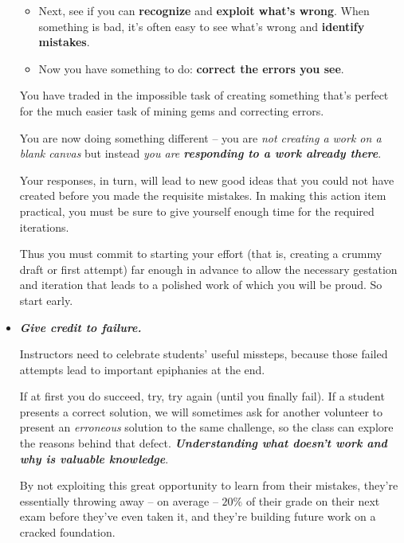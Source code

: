 \documentclass[11pt]{article}
\begin{document}
\begin{itemize}
\begin{exercise}
\begin{itemize}
\item Next, see if you can \textbf{recognize} and \textbf{exploit what’s wrong}. When something is bad, it’s often easy to see what’s wrong and \textbf{identify mistakes}. 

\item Now you have something to do: \textbf{correct the errors you see}. 
\end{itemize}
\end{exercise}
You have traded in the impossible task of creating something that’s perfect for the much easier task of mining gems and correcting errors. 

You are now doing something different -- you are \emph{not creating a work on a blank canvas} but instead \emph{you are \textbf{responding to a work already there}}. 

Your responses, in turn, will lead to new good ideas that you could not have created before you made the requisite mistakes. In making this action item practical, you must be sure to give yourself enough time for the required iterations. 

Thus you must commit to starting your effort (that is, creating a crummy draft or first attempt) far enough in advance to allow the necessary gestation and iteration that leads to a polished work of which you will be proud. So start early.


\item \emph{\textbf{Give credit to failure.}} 

Instructors need to celebrate students’ useful missteps, because those failed attempts lead to important epiphanies at the end. 

If at first you do succeed, try, try again (until you finally fail). If a student presents a correct solution, we will sometimes ask for another volunteer to present an \emph{erroneous} solution to the same challenge, so the class can explore the reasons behind that defect. \emph{\textbf{Understanding what doesn’t work and why is valuable knowledge}}. 

By not exploiting this great opportunity to learn from their mistakes, they’re essentially throwing away -- on average -- $20\%$ of their grade on their next exam before they’ve even taken it, and they’re building future work on a cracked foundation. 
\end{itemize}
\end{document}
